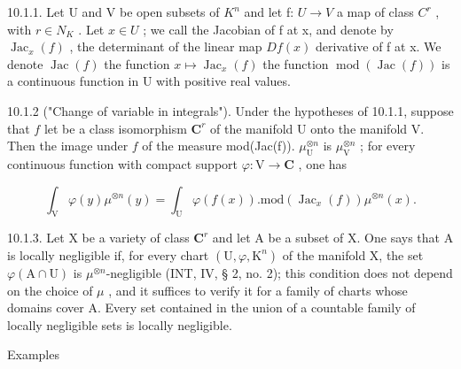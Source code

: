 10.1.1. Let U and V be open subsets of \(K^{n}\) and let f: \(U \to V\) a map of class \(C^{r}\) , with \(r \in N_{K}\) . Let \(x \in U\) ; we call the Jacobian of f at x, and denote by \(\operatorname{Jac}_{x}(f)\) , the determinant of the linear map \(Df(x)\) derivative of f at x. We denote \(\operatorname{Jac}(f)\) the function \(x \mapsto \operatorname{Jac}_{x}(f)\) the function \(\operatorname{mod}(\operatorname{Jac}(f))\) is a continuous function in U with positive real values.

10.1.2 ("Change of variable in integrals"). Under the hypotheses of 10.1.1, suppose that \(f\) let be a class isomorphism \(\mathbf{C}^{r}\) of the manifold U onto the manifold V. Then the image under \(f\) of the measure mod(Jac(f)). \(\mu_{\mathrm{U}}^{\otimes n}\) is \(\mu_{\mathrm{V}}^{\otimes n}\) ; for every continuous function with compact support \(\varphi: \mathrm{V} \to \mathbf{C}\) , one has

\[
\int_ {\mathrm{V}} \varphi (y) \mu^ {\otimes n} (y) = \int_ {\mathrm{U}} \varphi (f (x)). \mathrm{mod} (\operatorname{Jac} _ {x} (f)) \mu^ {\otimes n} (x).\tag{1}
\]

10.1.3. Let X be a variety of class \(\mathbf{C}^r\) and let A be a subset of X. One says that A is locally negligible if, for every chart \((\mathrm{U},\varphi ,\mathrm{K}^n)\) of the manifold X, the set \(\varphi (\mathrm{A}\cap \mathrm{U})\) is \(\mu^{\otimes n}\)-negligible (INT, IV, § 2, no. 2); this condition does not depend on the choice of \(\mu\) , and it suffices to verify it for a family of charts whose domains cover A. Every set contained in the union of a countable family of locally negligible sets is locally negligible.

Examples

